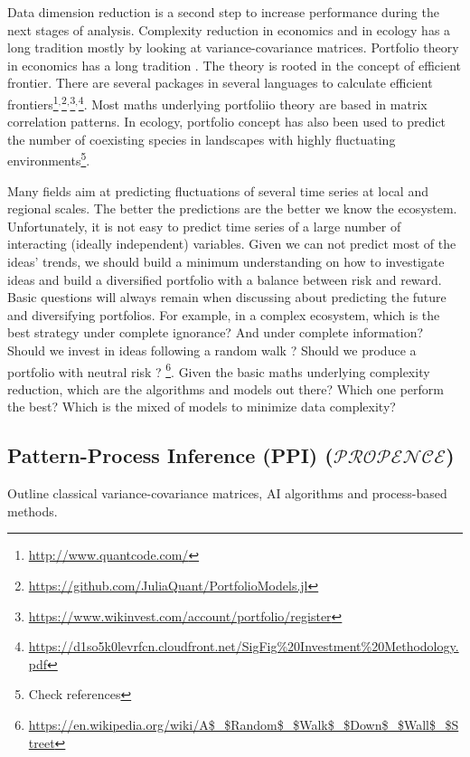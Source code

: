 \documentclass[english,12pt]{article}
\begin{document}
Data dimension reduction is a second step to increase performance
during the next stages of analysis.  Complexity reduction in economics
and in ecology has a long tradition mostly by looking at
variance-covariance matrices.  Portfolio theory in economics has a
long tradition \citep{MarkowitzBook}. The theory is rooted in the
concept of efficient frontier. There are
several packages in several languages to calculate efficient
frontiers\footnote{\url{http://www.quantcode.com/}}$^{,}$\footnote{\url{https://github.com/JuliaQuant/PortfolioModels.jl}}$^{,}$\footnote{\url{https://www.wikinvest.com/account/portfolio/register}}$^{,}$\footnote{\url{https://d1so5k0levrfcn.cloudfront.net/SigFig\%20Investment\%20Methodology.pdf}}. Most
maths underlying portfoliio theory are based
in matrix correlation patterns. In
ecology, portfolio concept has also been used to predict the number of
coexisting species in landscapes with highly fluctuating
environments\footnote{Check references}.

Many fields aim at predicting fluctuations of several time series at
local and regional scales. The better the predictions are the better
we know the ecosystem. Unfortunately, it is not easy to predict time
series of a large number of interacting (ideally independent)
variables. Given we can not predict most of the ideas' trends, we
should build a minimum understanding on how to investigate ideas and
build a diversified portfolio with a balance between risk and
reward. Basic questions will always remain when discussing about
predicting the future and diversifying portfolios. For example, in a
complex ecosystem, which is the best strategy under complete
ignorance? And under complete information?  Should we invest in ideas
following a random walk ? Should we produce a
portfolio with neutral risk ?
\footnote{\url{https://en.wikipedia.org/wiki/A$_$Random$_$Walk$_$Down$_$Wall$_$Street}}. Given
the basic maths underlying complexity reduction, which are the
algorithms and models out there? Which one perform the best? Which is
the mixed of models to minimize data complexity?
\\

\subsection{Pattern-Process Inference (PPI) ($\mathcal{PROPENCE}$)}

Outline classical variance-covariance matrices, AI
algorithms and process-based methods.
\end{document}
